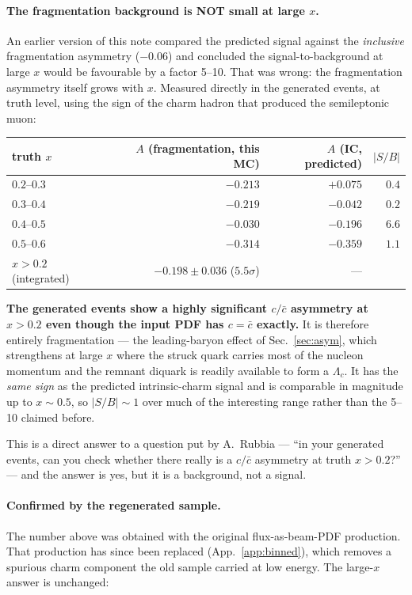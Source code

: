 \documentclass[11pt,a4paper]{article}
\begin{document}
\paragraph{The fragmentation background is NOT small at large $x$.} An earlier
version of this note compared the predicted signal against the \emph{inclusive}
fragmentation asymmetry ($-0.06$) and concluded the signal-to-background at
large $x$ would be favourable by a factor 5--10. That was wrong: the
fragmentation asymmetry itself grows with $x$. Measured directly in the
generated events, at truth level, using the sign of the charm hadron that
produced the semileptonic muon:

\begin{center}\small
\begin{tabular}{lrrr}
\toprule
truth $x$ & $A$ (fragmentation, this MC) & $A$ (IC, predicted) & $|S/B|$ \\
\midrule
$0.2$--$0.3$ & $-0.213$ & $+0.075$ & $0.4$ \\
$0.3$--$0.4$ & $-0.219$ & $-0.042$ & $0.2$ \\
$0.4$--$0.5$ & $-0.030$ & $-0.196$ & $6.6$ \\
$0.5$--$0.6$ & $-0.314$ & $-0.359$ & $1.1$ \\
\midrule
$x>0.2$ (integrated) & $\mathbf{-0.198\pm0.036}$ ($5.5\sigma$) & --- & \\
\bottomrule
\end{tabular}
\end{center}

\noindent
\textbf{The generated events show a highly significant $c/\bar{c}$ asymmetry at
$x>0.2$ even though the input PDF has $c=\bar{c}$ exactly.} It is therefore
entirely fragmentation --- the leading-baryon effect of Sec.~\ref{sec:asym},
which strengthens at large $x$ where the struck quark carries most of the
nucleon momentum and the remnant diquark is readily available to form a
$\Lambda_c$. It has the \emph{same sign} as the predicted intrinsic-charm signal
and is comparable in magnitude up to $x\sim0.5$, so $|S/B|\sim1$ over much of the
interesting range rather than the 5--10 claimed before.

This is a direct answer to a question put by A.~Rubbia --- ``in your generated
events, can you check whether there really is a $c/\bar{c}$ asymmetry at
truth $x>0.2$?'' --- and the answer is yes, but it is a background, not a signal.

\paragraph{Confirmed by the regenerated sample.} The number above was obtained
with the original flux-as-beam-PDF production. That production has since been
replaced (App.~\ref{app:binned}), which removes a spurious charm component the
old sample carried at low energy. The large-$x$ answer is unchanged:
\end{document}
